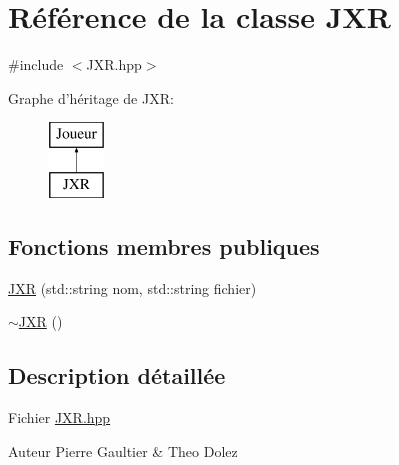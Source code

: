 \hypertarget{class_j_x_r}{\section{\-Référence de la classe \-J\-X\-R}
\label{class_j_x_r}
}


{\ttfamily \#include $<$\-J\-X\-R.\-hpp$>$}

\-Graphe d'héritage de \-J\-X\-R\-:\begin{figure}[H]
\begin{center}
\leavevmode
\includegraphics[height=2.000000cm]{class_j_x_r}
\end{center}
\end{figure}
\subsection*{\-Fonctions membres publiques}
\begin{DoxyCompactItemize}
\item 
\hyperlink{class_j_x_r_aae0980eb175a7241780f7b356bfc225f}{\-J\-X\-R} (std\-::string nom, std\-::string fichier)
\item 
\hyperlink{class_j_x_r_ab45417fe9d5e2460b6fdfd650692c2e1}{$\sim$\-J\-X\-R} ()
\end{DoxyCompactItemize}


\subsection{\-Description détaillée}
\-Fichier \hyperlink{_j_x_r_8hpp}{\-J\-X\-R.\-hpp} \begin{DoxyAuthor}{\-Auteur}
\-Pierre \-Gaultier \& \-Theo \-Dolez 
\end{DoxyAuthor}


